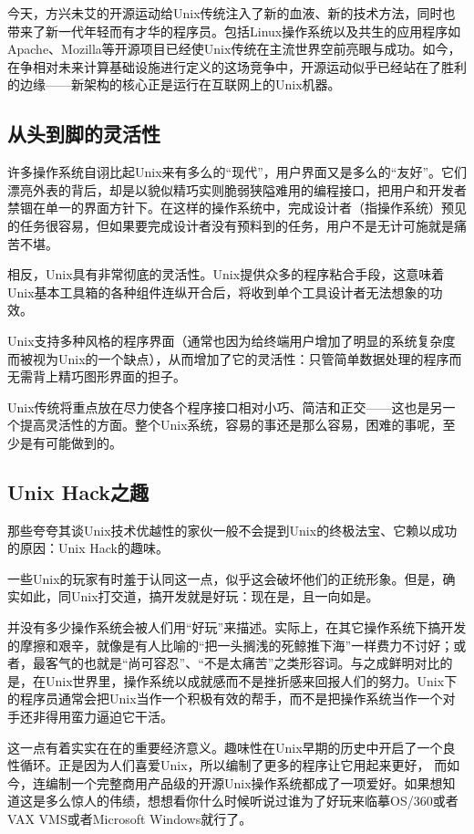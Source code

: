\documentclass[12pt,oneside]{book}
\begin{document}
\begin{common-format}
今天，方兴未艾的开源运动给Unix传统注入了新的血液、新的技术方法，同时也带来了新一代年轻而有才华的程序员。包括Linux操作系统以及共生的应用程序如Apache、Mozilla等开源项目已经使Unix传统在主流世界空前亮眼与成功。如今，在争相对未来计算基础设施进行定义的这场竞争中，开源运动似乎已经站在了胜利的边缘——新架构的核心正是运行在互联网上的Unix机器。

\subsection{从头到脚的灵活性}
许多操作系统自诩比起Unix来有多么的“现代”，用户界面又是多么的“友好”。它们漂亮外表的背后，却是以貌似精巧实则脆弱狭隘难用的编程接口，把用户和开发者禁锢在单一的界面方针下。在这样的操作系统中，完成设计者（指操作系统）预见的任务很容易，但如果要完成设计者没有预料到的任务，用户不是无计可施就是痛苦不堪。

相反，Unix具有非常彻底的灵活性。Unix提供众多的程序粘合手段，这意味着Unix基本工具箱的各种组件连纵开合后，将收到单个工具设计者无法想象的功效。

Unix支持多种风格的程序界面（通常也因为给终端用户增加了明显的系统复杂度而被视为Unix的一个缺点），从而增加了它的灵活性：只管简单数据处理的程序而无需背上精巧图形界面的担子。

Unix传统将重点放在尽力使各个程序接口相对小巧、简洁和正交——这也是另一个提高灵活性的方面。整个Unix系统，容易的事还是那么容易，困难的事呢，至少是有可能做到的。

\subsection{Unix Hack之趣}
那些夸夸其谈Unix技术优越性的家伙一般不会提到Unix的终极法宝、它赖以成功的原因：Unix Hack的趣味。

一些Unix的玩家有时羞于认同这一点，似乎这会破坏他们的正统形象。但是，确实如此，同Unix打交道，搞开发就是好玩：现在是，且一向如是。

并没有多少操作系统会被人们用“好玩”来描述。实际上，在其它操作系统下搞开发的摩擦和艰辛，就像是有人比喻的“把一头搁浅的死鲸推下海”一样费力不讨好；或者，最客气的也就是“尚可容忍”、“不是太痛苦”之类形容词。与之成鲜明对比的是，在Unix世界里，操作系统以成就感而不是挫折感来回报人们的努力。Unix下的程序员通常会把Unix当作一个积极有效的帮手，而不是把操作系统当作一个对手还非得用蛮力逼迫它干活。

这一点有着实实在在的重要经济意义。趣味性在Unix早期的历史中开启了一个良性循环。正是因为人们喜爱Unix，所以编制了更多的程序让它用起来更好，  而如今，连编制一个完整商用产品级的开源Unix操作系统都成了一项爱好。如果想知道这是多么惊人的伟绩，想想看你什么时候听说过谁为了好玩来临摹OS/360或者VAX VMS或者Microsoft Windows就行了。


\end{common-format}
\end{document}
